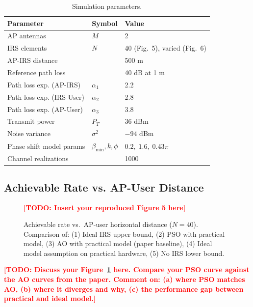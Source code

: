 \documentclass[12pt, a4paper]{article}
\newcommand{\TODO}[1]{\textcolor{red}{\textbf{[TODO: #1]}}}  %
\begin{document}
\begin{table}[H]
    \centering
    \caption{Simulation parameters.}
    \label{tab:sim_params}
    \begin{tabular}{lll}
        \toprule
        \textbf{Parameter} & \textbf{Symbol} & \textbf{Value} \\
        \midrule
        AP antennas              & $M$           & 2 \\
        IRS elements             & $N$           & 40 (Fig.~5), varied (Fig.~6) \\
        AP-IRS distance          &               & 500 m \\
        Reference path loss      &               & 40 dB at 1 m \\
        Path loss exp. (AP-IRS)  & $\alpha_1$    & 2.2 \\
        Path loss exp. (IRS-User)& $\alpha_2$    & 2.8 \\
        Path loss exp. (AP-User) & $\alpha_3$    & 3.8 \\
        Transmit power           & $P_T$         & 36 dBm \\
        Noise variance           & $\sigma^2$    & $-94$ dBm \\
        Phase shift model params & $\beta_{\min}, k, \phi$ & $0.2,\;1.6,\;0.43\pi$ \\
        Channel realizations     &               & 1000 \\
        \bottomrule
    \end{tabular}
\end{table}

\subsection{Achievable Rate vs. AP-User Distance}

\begin{figure}[H]
    \centering
    \TODO{Insert your reproduced Figure 5 here}
    \caption{Achievable rate vs.\ AP-user horizontal distance ($N=40$).
             Comparison of: (1) Ideal IRS upper bound, (2) PSO with practical
             model, (3) AO with practical model (paper baseline), (4) Ideal
             model assumption on practical hardware, (5) No IRS lower bound.}
    \label{fig:rate_vs_distance}
\end{figure}

\TODO{Discuss your Figure~\ref{fig:rate_vs_distance} here.
Compare your PSO curve against the AO curves from the paper.
Comment on: (a) where PSO matches AO, (b) where it diverges and why,
(c) the performance gap between practical and ideal model.}
\end{document}
